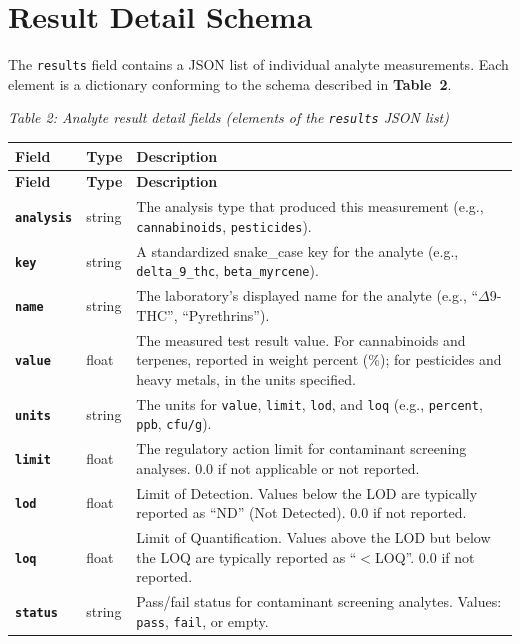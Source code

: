 \documentclass[11pt,letterpaper]{article}
\newcommand{\fieldname}[1]{\texttt{\textbf{#1}}}
\begin{document}
\section{Result Detail Schema}

The \texttt{results} field contains a JSON list of individual analyte
measurements. Each element is a dictionary conforming to the schema
described in \textbf{Table~2}.

\vspace{0.5em}

\noindent\textit{Table 2: Analyte result detail fields (elements of the
\texttt{results} JSON list)}

\vspace{0.5em}

\small
\renewcommand{\arraystretch}{1.5}
\begin{longtable}{@{}L{2.5cm}C{1.1cm}p{13.0cm}@{}}
\toprule
\textbf{Field} & \textbf{Type} & \textbf{Description} \\
\midrule
\endfirsthead
\toprule
\textbf{Field} & \textbf{Type} & \textbf{Description} \\
\midrule
\endhead
\bottomrule
\endlastfoot
\fieldname{analysis} & string & The analysis type that produced this measurement (e.g., \texttt{cannabinoids}, \texttt{pesticides}). \\[0.4em]
\fieldname{key} & string & A standardized snake\_case key for the analyte (e.g., \texttt{delta\_9\_thc}, \texttt{beta\_myrcene}). \\[0.4em]
\fieldname{name} & string & The laboratory's displayed name for the analyte (e.g., ``$\Delta$9-THC'', ``Pyrethrins''). \\[0.4em]
\fieldname{value} & float & The measured test result value. For cannabinoids and terpenes, reported in weight percent (\%); for pesticides and heavy metals, in the units specified. \\[0.4em]
\fieldname{units} & string & The units for \texttt{value}, \texttt{limit}, \texttt{lod}, and \texttt{loq} (e.g., \texttt{percent}, \texttt{ppb}, \texttt{cfu/g}). \\[0.4em]
\fieldname{limit} & float & The regulatory action limit for contaminant screening analyses. 0.0 if not applicable or not reported. \\[0.4em]
\fieldname{lod} & float & Limit of Detection. Values below the LOD are typically reported as ``ND'' (Not Detected). 0.0 if not reported. \\[0.4em]
\fieldname{loq} & float & Limit of Quantification. Values above the LOD but below the LOQ are typically reported as ``$<$LOQ''. 0.0 if not reported. \\[0.4em]
\fieldname{status} & string & Pass/fail status for contaminant screening analytes. Values: \texttt{pass}, \texttt{fail}, or empty. \\
\end{longtable}
\end{document}
